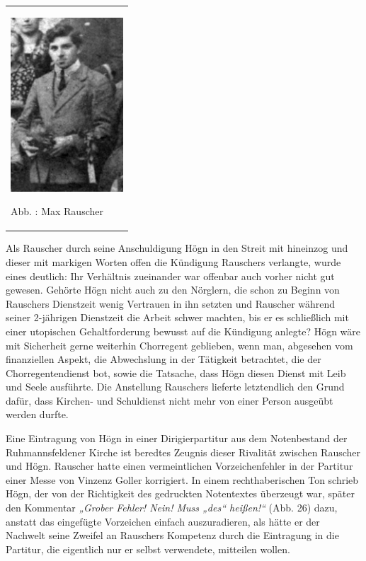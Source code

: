 \documentclass[a4paper]{article}
\newcommand\textstyleZitate[1]{\textit{#1}}
\newcounter{Abb}
\renewcommand\theAbb{\arabic{Abb}}
\begin{document}
\begin{center}
\begin{minipage}{4.591cm}
\begin{center}
\tablefirsthead{}
\tablehead{}
\tabletail{}
\tablelasttail{}
\begin{supertabular}{m{4.3910003cm}}

\includegraphics[width=4.209cm,height=6.507cm]{pictures/zulassungsarbeit-img027.jpg}

Abb. \stepcounter{Abb}{\theAbb}: Max Rauscher\\
\end{supertabular}
\end{center}
\end{minipage}
\end{center}
Als Rauscher durch seine Anschuldigung Högn in den Streit mit hineinzog
und dieser mit markigen Worten offen die Kündigung Rauschers verlangte,
wurde eines deutlich: Ihr Verhältnis zueinander war offenbar auch
vorher nicht gut gewesen. Gehörte Högn nicht auch zu den Nörglern, die
schon zu Beginn von Rauschers Dienstzeit wenig Vertrauen in ihn setzten
und Rauscher während seiner 2-jährigen Dienstzeit die Arbeit schwer
machten, bis er es schließlich mit einer utopischen Gehaltforderung
bewusst auf die Kündigung anlegte? Högn wäre mit Sicherheit gerne
weiterhin Chorregent geblieben, wenn man, abgesehen vom finanziellen
Aspekt, die Abwechslung in der Tätigkeit betrachtet, die der
Chorregentendienst bot, sowie die Tatsache, dass Högn diesen Dienst mit
Leib und Seele ausführte. Die Anstellung Rauschers lieferte
letztendlich den Grund dafür, dass Kirchen- und Schuldienst nicht mehr
von einer Person ausgeübt werden durfte.

Eine Eintragung von Högn in einer Dirigierpartitur aus dem Notenbestand
der Ruhmannsfeldener Kirche ist beredtes Zeugnis dieser Rivalität
zwischen Rauscher und Högn. Rauscher hatte einen vermeintlichen
Vorzeichenfehler in der Partitur einer Messe von Vinzenz Goller
korrigiert. In einem rechthaberischen Ton schrieb Högn, der von der
Richtigkeit des gedruckten Notentextes überzeugt war, später den
Kommentar \textstyleZitate{„Grober Fehler! Nein! Muss „des“ heißen!“
}(Abb. 26) dazu, anstatt das eingefügte Vorzeichen einfach
auszuradieren, als hätte er der Nachwelt seine Zweifel an Rauschers
Kompetenz durch die Eintragung in die Partitur, die eigentlich nur er
selbst verwendete, mitteilen wollen.
\end{document}
